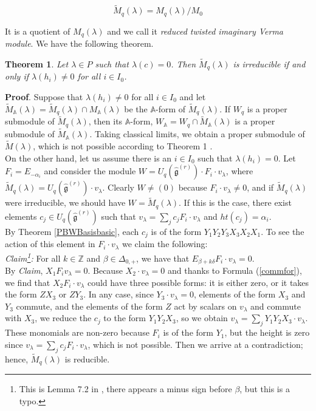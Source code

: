 \documentclass[12pt]{amsart}
\newtheorem{thm}{Theorem}[section]
\numberwithin{equation}{section}
\newcommand{\dem }{\noindent\textbf{Proof}. }
\newcommand{\Z}{\ensuremath{\mathbb{Z}}}
\newcommand{\A}{\ensuremath{\mathbb{A}}}
\newcommand{\g}{\ensuremath{\mathfrak{g}}}
\begin{document}
$$ \tilde{M}_q(\lambda) = M_q(\lambda )/M_0$$

It is a quotient of $M_q(\lambda)$ and we call it {\it reduced twisted imaginary Verma module}. We have the following theorem.

\begin{thm} Let $\lambda\in P$ such that $\lambda(c)=0$. Then $\tilde{M}_q(\lambda)$ is irreducible if and only if $\lambda(h_i)\neq 0$ for all $i\in I_0$.  \end{thm}

\dem Suppose that $\lambda(h_i)\neq 0$ for all $i\in I_0$ and let $\tilde{M}_{\A}(\lambda) = \tilde{M}_q(\lambda) \cap M_{\A}(\lambda)$ be the $\A$-form of $\tilde{M}_q(\lambda)$. If $W_q$ is a proper submodule of $\tilde{M}_q(\lambda)$, then its $\A$-form, $W_{\A} = W_q\cap \tilde{M}_{\A}(\lambda)$ is a proper submodule of $\tilde{M}_{\A}(\lambda)$. Taking classical limits, we obtain a proper submodule of $\tilde{M}(\lambda)$, which is not possible according to Theorem 1 \cite{Fut}.\\

On the other hand, let us assume there is an $i \in I_0$ such that $\lambda(h_i)=0$. Let $F_i = E_{-\alpha_i}$ and consider the module $W = U_q(\hat{\g}^{(r)})\cdot F_i\cdot v_\lambda$, where $\tilde{M}_q(\lambda) = U_q(\hat{\g}^{(r)})\cdot v_\lambda$. Clearly $W \neq (0)$ because $F_i\cdot v_\lambda \neq 0$, and if $\tilde{M}_q(\lambda)$ were irreducible, we should have $W = \tilde{M}_q(\lambda)$. If this is the case, there exist elements $c_j \in U_q(\hat{\g}^{(r)})$ such that $v_\lambda = \sum_j c_jF_i\cdot v_\lambda$ and $ht(c_j)=\alpha_i$.\\

By Theorem \ref{PBWBasisbasic}, each $c_j$ is of the form $Y_1Y_2Y_3X_3X_2X_1$. To see the action of this element in $F_i\cdot v_\lambda$ we claim the following: \\

{\it Claim\footnote{This is Lemma 7.2 in \cite{FGM}, there appears a minus sign before $\beta$, but this is a typo.}:} For all $k \in \Z$ and $\beta  \in \Delta_{0,+}$, we have that $E_{\beta+k\delta}F_i\cdot v_\lambda = 0$.\\

By {\it Claim}, $X_1F_iv_\lambda = 0$. Because $X_2\cdot v_\lambda = 0$ and thanks to Formula (\ref{commfor}), we find that $X_2F_i\cdot v_\lambda$ could have three possible forms: it is either zero, or it takes the form $ZX_3$ or $ZY_3$. In any case, since $Y_3\cdot v_{\lambda} = 0$, elements of the form $X_3$ and $Y_3$ commute, and the elements of the form $Z$ act by scalars on $v_\lambda$ and commute with $X_3$, we reduce the $c_j$ to the form $Y_1Y_2X_3$, so we obtain $v_\lambda = \sum_j Y_1Y_2X_3\cdot v_\lambda$. These monomials are non-zero because $F_i$ is of the form $Y_1$, but the height is zero since $v_\lambda = \sum_j c_jF_i\cdot v_\lambda$, which is not possible. Then we arrive at a contradiction; hence, $\tilde{M}_q(\lambda)$ is reducible. \\
\end{document}

